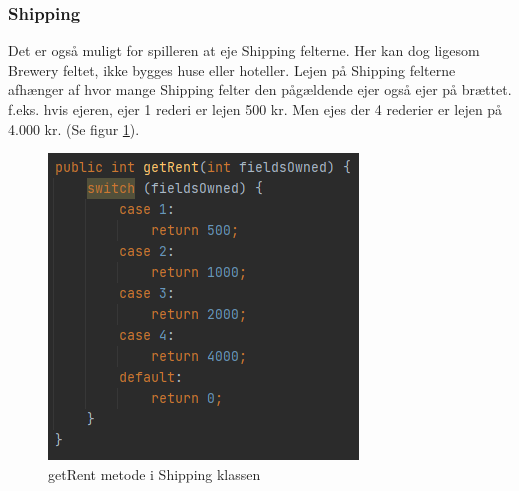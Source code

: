 \subsubsection{Shipping}
Det er også muligt for spilleren at eje Shipping felterne. Her kan dog ligesom Brewery feltet, ikke bygges huse eller hoteller. Lejen på Shipping felterne afhænger af hvor mange Shipping felter den pågældende ejer også ejer på brættet. f.eks. hvis ejeren, ejer 1 rederi er lejen 500 kr. Men ejes der 4 rederier er lejen på 4.000 kr. (Se figur \ref{fig:shippingRent}).
\begin{figure}[H]
    \centering
    \includegraphics{sources/7_implementering/shippingrent.PNG}
    \caption{getRent metode i Shipping klassen}
    \label{fig:shippingRent}
\end{figure}